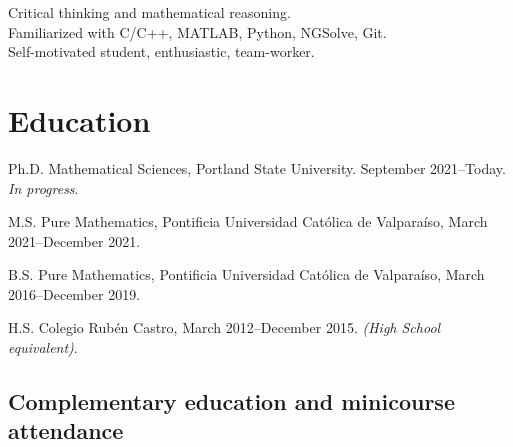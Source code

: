 \documentclass[12pt,letterpaper]{report}
\begin{document}
    Critical thinking and mathematical reasoning.\\
    Familiarized with C/C++, MATLAB, Python, NGSolve, Git.\\
    Self-motivated student, enthusiastic, team-worker.


    
    \section*{Education}

    \begin{tablist}
        \item[Ph.D.] \tab Mathematical Sciences, Portland State University. September 2021--Today. \emph{In progress}.
        \item[M.S.]  \tab Pure Mathematics, Pontificia Universidad Cat\'olica de Valpara\'iso, March 2021--December 2021.
        \item[B.S.]  \tab Pure Mathematics, Pontificia Universidad Cat\'olica de Valpara\'iso, March 2016--December 2019.
        \item[H.S.] \tab Colegio Rub\'en Castro, March 2012--December 2015. \emph{(High School equivalent)}.

    \end{tablist}

    \subsection*{Complementary education and minicourse attendance}
\end{document}
